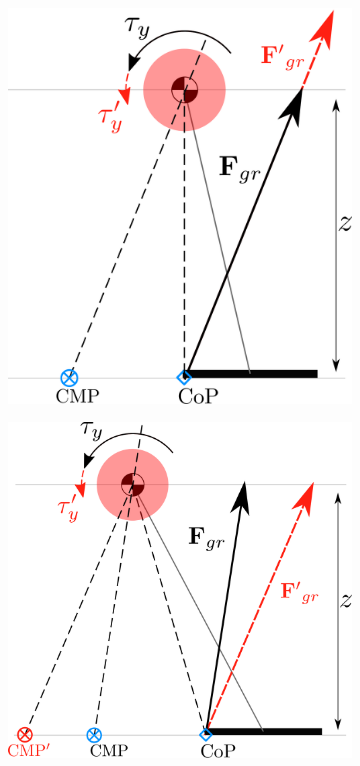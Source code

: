\begin{figure}[h]
\begin{subfigure}{0.3\textwidth}
  \includegraphics[width=.8\linewidth]{STYLESTUFF/2DCMPVIZCoPzero.png}
  \caption{}
   \label{fig:cmpFzb}
  \end{subfigure}
  \begin{subfigure}{0.35\textwidth}
    \centering
  \includegraphics[width=.8\linewidth]{STYLESTUFF/2DCMPVIZFgradjusted.png}
    \caption{}
     \label{fig:cmpFzc}
  \end{subfigure}
  \caption{}
  \label{fig:cmpFz}
\end{figure}

